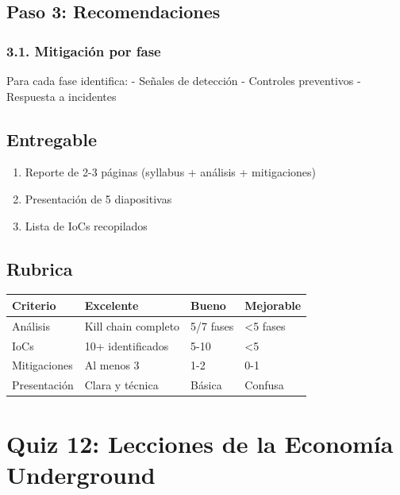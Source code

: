 \documentclass[
  letterpaper,
]{report}
\newcounter{none} %
\providecommand{\tightlist}{%
  \setlength{\itemsep}{0pt}\setlength{\parskip}{0pt}}
\begin{document}
\section{Paso 3: Recomendaciones}\label{paso-3-recomendaciones}

\subsection{3.1. Mitigación por fase}\label{mitigaciuxf3n-por-fase}

Para cada fase identifica: - Señales de detección - Controles
preventivos - Respuesta a incidentes

\section{Entregable}\label{entregable}

\begin{enumerate}
\def\labelenumi{\arabic{enumi}.}
\tightlist
\item
  Reporte de 2-3 páginas (syllabus + análisis + mitigaciones)
\item
  Presentación de 5 diapositivas
\item
  Lista de IoCs recopilados
\end{enumerate}

\section{Rubrica}\label{rubrica-1}

{\def\LTcaptype{none} %
\begin{longtable}[]{@{}llll@{}}
\toprule\noalign{}
Criterio & Excelente & Bueno & Mejorable \\
\midrule\noalign{}
\endhead
\bottomrule\noalign{}
\endlastfoot
Análisis & Kill chain completo & 5/7 fases & \textless5 fases \\
IoCs & 10+ identificados & 5-10 & \textless5 \\
Mitigaciones & Al menos 3 & 1-2 & 0-1 \\
Presentación & Clara y técnica & Básica & Confusa \\
\end{longtable}
}

\chapter{Quiz 12: Lecciones de la Economía
Underground}\label{quiz-12-lecciones-de-la-economuxeda-underground}
\end{document}
